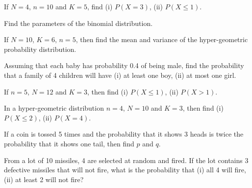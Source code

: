 \documentclass[11pt,a4paper]{article}
\begin{document}
\begin{longlist}
\item If $N=4$, $n=10$ and $K=5$, find (i) $P(X=3)$, (ii) $P(X\leq 1)$.

\item Find the parameters of the binomial distribution.

\item If $N=10$, $K=6$, $n=5$, then find the mean and variance of the hyper-geometric probability distribution.

\item Assuming that each baby has probability 0.4 of being male, find the probability that a family of 4 children will have (i) at least one boy, (ii) at most one girl.

\item If $n=5$, $N=12$ and $K=3$, then find (i) $P(X\leq 1)$, (ii) $P(X>1)$.

\item In a hyper-geometric distribution $n=4$, $N=10$ and $K=3$, then find (i) $P(X\leq 2)$, (ii) $P(X=4)$.

\item If a coin is tossed 5 times and the probability that it shows 3 heads is twice the probability that it shows one tail, then find $p$ and $q$.

\item From a lot of 10 missiles, 4 are selected at random and fired. If the lot contains 3 defective missiles that will not fire, what is the probability that (i) all 4 will fire, (ii) at least 2 will not fire?

\end{longlist}
\end{document}
